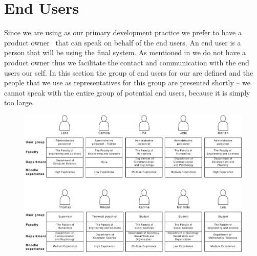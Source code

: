 \section{End Users}
\label{sec:enduser}
Since we are using \scrum{} as our primary development practice we prefer to have a product owner~\cite[p.~115]{Larman04} that can speak on behalf of the end users.
An end user is a person that will be using the final system.
As mentioned in  we do not have a product owner thus we facilitate the contact and communication with the end users our self.
In this section the group of end users for our \subsystem{} are defined and  the people that we use as representatives for this group are  presented shortly -- we cannot speak with the entire group of potential end users, because it is simply too large.


\begin{figure}%
\includegraphics[width=\textwidth]{images/UserGroups}%
\caption{}%
\label{fig:usergroup}%
\end{figure}

